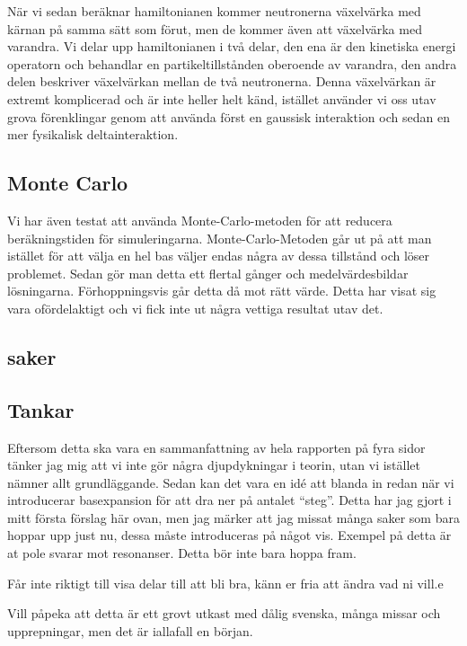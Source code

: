 \documentclass[12pt,a4paper]{article}
\begin{document}
När vi sedan beräknar hamiltonianen kommer neutronerna växelvärka med kärnan på samma sätt som förut, men de kommer även att växelvärka med varandra. Vi delar upp hamiltonianen i två delar, den ena är den kinetiska energi operatorn och behandlar en partikeltillstånden oberoende av varandra, den andra delen beskriver växelvärkan mellan de två neutronerna.
Denna växelvärkan är extremt komplicerad och är inte heller helt känd, istället använder vi oss utav grova förenklingar genom att använda först en gaussisk interaktion och sedan en mer fysikalisk deltainteraktion.



\subsection{Monte Carlo}
Vi har även testat att använda Monte-Carlo-metoden för att reducera beräkningstiden för simuleringarna.
Monte-Carlo-Metoden går ut på att man istället för att välja en hel bas väljer endas några av dessa tillstånd och löser problemet.
Sedan gör man detta ett flertal gånger och medelvärdesbildar lösningarna.
Förhoppningsvis går detta då mot rätt värde.
Detta har visat sig vara ofördelaktigt och vi fick inte ut några vettiga resultat utav det.

\subsection{saker}

\subsection{Tankar}
Eftersom detta ska vara en sammanfattning av hela rapporten på fyra sidor tänker jag mig att vi inte gör några djupdykningar i teorin, utan vi istället nämner allt grundläggande. Sedan kan det vara en idé att blanda in  redan när vi introducerar basexpansion för att dra ner på antalet ``steg''. Detta har jag gjort i mitt första förslag här ovan, men jag märker att jag missat många saker som bara hoppar upp just nu, dessa måste introduceras på något vis. Exempel på detta är at pole svarar mot resonanser. Detta bör inte bara hoppa fram.

Får inte riktigt till visa delar till att bli bra, känn er fria att ändra vad ni vill.e

Vill påpeka att detta är ett grovt utkast med dålig svenska, många missar och upprepningar, men det är iallafall en början.
\end{document}

